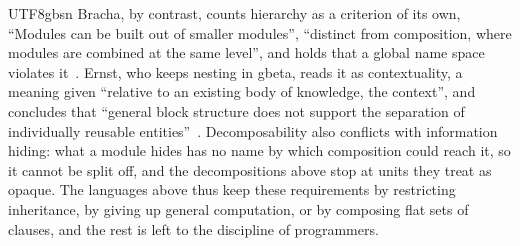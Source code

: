 \begin{CJK*}{UTF8}{gbsn}
Bracha, by contrast, counts hierarchy as a criterion of its own, ``Modules can be built out of smaller
modules'', ``distinct from composition, where modules are combined at the same level'', and holds that a global
name space violates it~\cite[pp.~13, 16]{bracha1992-jigsaw-mixins}.
Ernst, who keeps nesting in gbeta, reads it as contextuality, a meaning given ``relative to an existing
body of knowledge, the context'', and concludes that ``general block structure does not support the
separation of individually reusable entities''~\cite[pp.~104, 117]{ernst1999-gbeta}.
Decomposability also conflicts with information hiding: what a module hides has no name by which
composition could reach it, so it cannot be split off, and the decompositions above stop at units they
treat as opaque.
The languages above thus keep these requirements by restricting inheritance, by giving up general
computation, or by composing flat sets of clauses, and the rest is left to the discipline of programmers.
\fi


\end{CJK*}
